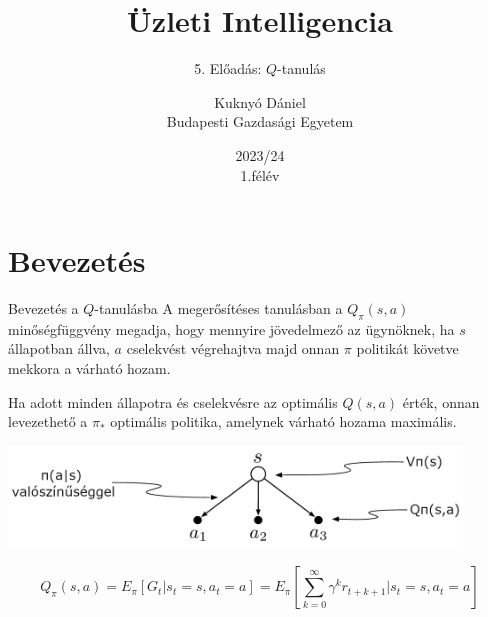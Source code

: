 \documentclass[english, aspectratio=169]{beamer}
\makeatletter
\newcommand\makebeamertitle{\frame{\maketitle}}
\let\origtableofcontents=\tableofcontents
\def\tableofcontents{\@ifnextchar[{\origtableofcontents}{\gobbletableofcontents}}
\def\gobbletableofcontents#1{\origtableofcontents}
\makeatother
\begin{document}
\section{Bevezetés}
\title[]{Üzleti Intelligencia}
\subtitle{5. Előadás: $Q$-tanulás}
\author[Kuknyó Dániel]{Kuknyó Dániel\\Budapesti Gazdasági Egyetem}
\date{2023/24\\1.félév}
\makebeamertitle

\begin{frame}
\tableofcontents{}
\end{frame}

\begin{frame}
\tableofcontents[currentsection]
\end{frame}

\begin{frame}{Bevezetés a $Q$-tanulásba}
A megerősítéses tanulásban a $Q_\pi(s,a)$ minőségfüggvény megadja, hogy mennyire jövedelmező az ügynöknek, ha $s$ állapotban állva, $a$ cselekvést végrehajtva majd onnan $\pi$ politikát követve mekkora a várható hozam.\par\smallskip
Ha adott minden állapotra és cselekvésre az optimális $Q(s,a)$ érték, onnan levezethető a $\pi_*$ optimális politika, amelynek várható hozama maximális.
\begin{center}
\includegraphics[width=12cm, keepaspectratio]{images/ql_1.png}
\begin{block}{}
\[
Q_\pi(s,a)=E_\pi \left[ G_t \vert s_t=s, a_t=a \right] = E_\pi \left[ \sum_{k=0}^\infty \gamma^kr_{t+k+1} \vert s_t=s, a_t=a \right]
\]
\end{block}
\end{center}
\end{frame}
\end{document}
